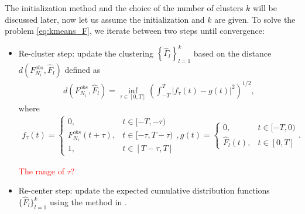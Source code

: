 		The initialization method and the choice of the number of clusters $k$ will be discussed later, now let us assume the initialization and $k$ are given.
		To solve the problem \eqref{eq:kmeans_F}, we iterate between two steps until convergence:
			\begin{itemize}
				\item Re-cluster step: update the clustering 
				$\left\{ \hat\Gamma_l \right\}_{l=1}^k$ based on the distance $d(F^{obs}_{N_i}, \hat F_l)$ 
				defined as 
				\begin{align*}
				 d(F^{obs}_{N_i}, \hat F_l) = \inf_{\tau\in[0,T]}\left( \int_{-T}^T\big| f_\tau(t)-g(t) \big|^2 \right)^{1/2},
				\end{align*}
				where
				\begin{align}\label{eq:def of shifted curve}
				f_\tau(t)=
				\begin{cases}
				0, &t\in[-T,-\tau)\\
				F_{N_i}^{obs}(t+ \tau), &t\in[-\tau,T-\tau)\\
				1,& t\in [T-\tau,T]
				\end{cases},
				g(t)=
				\begin{cases}
				0, &t\in[-T,0)\\
				\hat F_{l}(t), &t\in [0,T]
				\end{cases}.
				\end{align}
				
				
				\textcolor{red}{The range of $\tau$?}

				\item Re-center step: update the expected cumulative distribution functions $\{\hat F_l\}_{l=1}^k$ using the method in \citet{Bigot2013}.

			\end{itemize}

